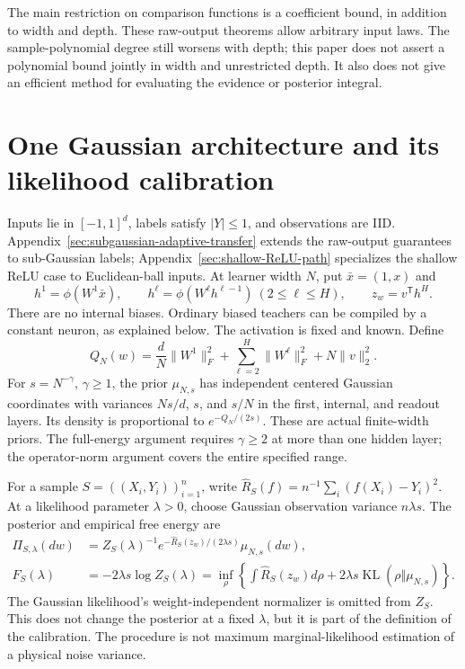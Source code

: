 \documentclass[11pt]{article}
\theoremstyle{definition}\newtheorem{definition}[theorem]{Definition}
\theoremstyle{remark}\newtheorem{remark}[theorem]{Remark}
\newcommand{\KL}{\operatorname{KL}}\newcommand{\Rad}{\operatorname{Rad}}\newcommand{\Lip}{\operatorname{Lip}}
\begin{document}
The main restriction on comparison functions is a coefficient bound, in addition to width and depth. These raw-output theorems allow arbitrary input laws. The sample-polynomial degree still worsens with depth; this paper does not assert a polynomial bound jointly in width and unrestricted depth. It also does not give an efficient method for evaluating the evidence or posterior integral.

\section{One Gaussian architecture and its likelihood calibration}
Inputs lie in $[-1,1]^d$, labels satisfy $|Y|\le1$, and observations are IID. Appendix~\ref{sec:subgaussian-adaptive-transfer} extends the raw-output guarantees to sub-Gaussian labels; Appendix~\ref{sec:shallow-ReLU-path} specializes the shallow ReLU case to Euclidean-ball inputs. At learner width $N$, put $\bar x=(1,x)$ and
\[
 h^1=\phi(W^1\bar x),\qquad h^\ell=\phi(W^\ell h^{\ell-1})\ (2\le\ell\le H),
 \qquad z_w=v^{\mathsf T}h^H.
\]
There are no internal biases. Ordinary biased teachers can be compiled by a constant neuron, as explained below. The activation is fixed and known. Define
\begin{equation}
 Q_N(w)=\frac dN\|W^1\|_F^2+\sum_{\ell=2}^H\|W^\ell\|_F^2+N\|v\|_2^2.
 \label{eq:energy}
\end{equation}
For $s=N^{-\gamma}$, $\gamma\ge1$, the prior $\mu_{N,s}$ has independent centered Gaussian coordinates with variances $Ns/d$, $s$, and $s/N$ in the first, internal, and readout layers. Its density is proportional to $e^{-Q_N/(2s)}$. These are actual finite-width priors. The full-energy argument requires $\gamma\ge2$ at more than one hidden layer; the operator-norm argument covers the entire specified range.

For a sample $S=((X_i,Y_i))_{i=1}^n$, write
$\widehat R_S(f)=n^{-1}\sum_i(f(X_i)-Y_i)^2$.
At a likelihood parameter $\lambda>0$, choose Gaussian observation variance $n\lambda s$. The posterior and empirical free energy are
\begin{align}
 \Pi_{S,\lambda}(dw)&=Z_S(\lambda)^{-1}
 e^{-\widehat R_S(z_w)/(2\lambda s)}\mu_{N,s}(dw),\label{eq:posterior}\\
 F_S(\lambda)&=-2\lambda s\log Z_S(\lambda)
 =\inf_\rho\left\{\int\widehat R_S(z_w)d\rho
                  +2\lambda s\KL(\rho\Vert\mu_{N,s})\right\}.
 \label{eq:freeenergy}
\end{align}
The Gaussian likelihood's weight-independent normalizer is omitted from $Z_S$. This does not change the posterior at a fixed $\lambda$, but it is part of the definition of the calibration. The procedure is not maximum marginal-likelihood estimation of a physical noise variance.
\end{document}
